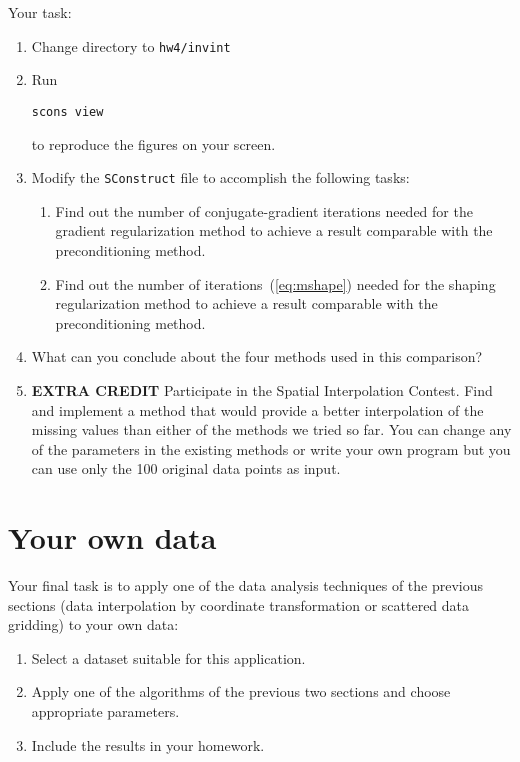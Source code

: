Your task:
\begin{enumerate}
\item Change directory to \texttt{hw4/invint}
\item Run 
\begin{verbatim}
scons view
\end{verbatim}
to reproduce the figures on your screen.
\item Modify the \texttt{SConstruct} file to accomplish the following
  tasks:
\begin{enumerate}
\item Find out 
the number of conjugate-gradient iterations needed for the gradient regularization method to achieve a result 
 comparable with the preconditioning method.
\item Find out 
the number of iterations~(\ref{eq:mshape}) needed for the shaping regularization method to achieve a result 
 comparable with the preconditioning method.
\end{enumerate}
\item What can you conclude about the four methods used in this comparison?
\item \textbf{EXTRA CREDIT} Participate in the Spatial Interpolation Contest. Find and
implement a method that would provide a better interpolation of the
missing values than either of the methods we tried so far. You can
change any of the parameters in the existing methods or write your own
program but you can use only the 100 original data points as input.
\end{enumerate}

\lstset{language=c,numbers=left,numberstyle=\tiny,showstringspaces=false}


\lstset{language=python,numbers=left,numberstyle=\tiny,showstringspaces=false}


\section{Your own data}

Your final task is to apply one of the data analysis techniques of the
previous sections (data interpolation by coordinate transformation or
scattered data gridding) to your own data:
\begin{enumerate}
\item Select a dataset suitable for this application.
\item Apply one of the algorithms of the previous two sections and choose appropriate parameters.
\item Include the results in your homework.
\end{enumerate}

